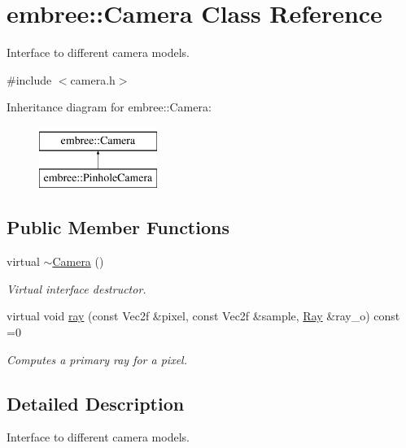 \hypertarget{classembree_1_1_camera}{
\section{embree::Camera Class Reference}
\label{classembree_1_1_camera}
}


Interface to different camera models.  




{\ttfamily \#include $<$camera.h$>$}

Inheritance diagram for embree::Camera:\begin{figure}[H]
\begin{center}
\leavevmode
\includegraphics[height=2.000000cm]{classembree_1_1_camera}
\end{center}
\end{figure}
\subsection*{Public Member Functions}
\begin{DoxyCompactItemize}
\item 
virtual \hyperlink{classembree_1_1_camera_af12dce0d47ac3ba31ec65e47fde64107}{$\sim$Camera} ()
\begin{DoxyCompactList}\small\item\em Virtual interface destructor. \item\end{DoxyCompactList}\item 
virtual void \hyperlink{classembree_1_1_camera_a30a3c91afaa91e78bd963d1e70e0fcdf}{ray} (const Vec2f \&pixel, const Vec2f \&sample, \hyperlink{structembree_1_1_ray}{Ray} \&ray\_\-o) const =0
\begin{DoxyCompactList}\small\item\em Computes a primary ray for a pixel. \item\end{DoxyCompactList}\end{DoxyCompactItemize}


\subsection{Detailed Description}
Interface to different camera models. 

